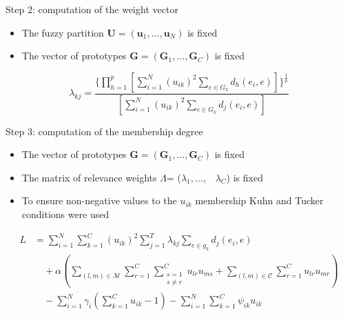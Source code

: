 \documentclass{beamer}
\begin{document}
\begin{frame}{Step 2: computation of the weight vector}
	\begin{itemize}
		\item{The fuzzy partition $\textbf{U}=(\textbf{u}_1,\ldots,\textbf{u}_N)$ is fixed}
		\item{The vector of prototypes $\textbf{G} = (\textbf{G}_{1},\ldots,\textbf{G}_{C})$ is fixed}
	\end{itemize}
	\begin{equation*}
		\lambda_{kj} = \frac{\{\prod_{h=1}^{p}[\sum_{i=1}^{N}(u_{ik})^{2}\sum_{e \in G_{k}}d_{h}(e_{i},e)]\}^{\frac{1}{p}}}{[\sum_{i=1}^{N}(u_{ik})^{2}\sum_{e \in G_{k}}d_{j}(e_{i},e)]}
	\end{equation*}
\end{frame}

\begin{frame}{Step 3: computation of the membership degree}
	\begin{itemize}
		\item{The vector of prototypes $\textbf{G} = (\textbf{G}_{1},\ldots,\textbf{G}_{C})$ is fixed}
		\item{The matrix of relevance weights \boldmath$\Lambda$\unboldmath = (\boldmath$\lambda$\unboldmath$_1,\ldots,$ \, \boldmath$\lambda$\unboldmath$_C$) is fixed}
		\item{To ensure non-negative values to the $u_{ik}$ membership Kuhn and Tucker conditions were used}
	\end{itemize}
\begin{displaymath}
\begin{split}
L&
=
\sum_{i=1}^{N}
\sum_{k=1}^{C}(u_{ik})^{2}
\sum_{j=1}^{T}\lambda_{kj}
\sum_{{e}\in{g_{k}}}d_{j}(e_{i},e) \\
& \quad +
\alpha
\left (
\sum_{(l,m)\in\mathcal{M}}
\sum_{r=1}^{C}
\sum_{
\substack{
s=1 \\ {s}\neq{r}
}
}^{C}u_{lr}u_{ms}
+
\sum_{(l,m)\in\mathcal{C}}
\sum_{r=1}^{C}u_{lr}u_{mr}
\right ) \\
& \quad -
\sum_{i=1}^{N}\gamma_{i}
\left (
\sum_{k=1}^{C}u_{ik}-1
\right )
-
\sum_{i=1}^{N}
\sum_{k=1}^{C}\psi_{ik}u_{ik}
\end{split}
\end{displaymath}
\end{frame}
\end{document}
